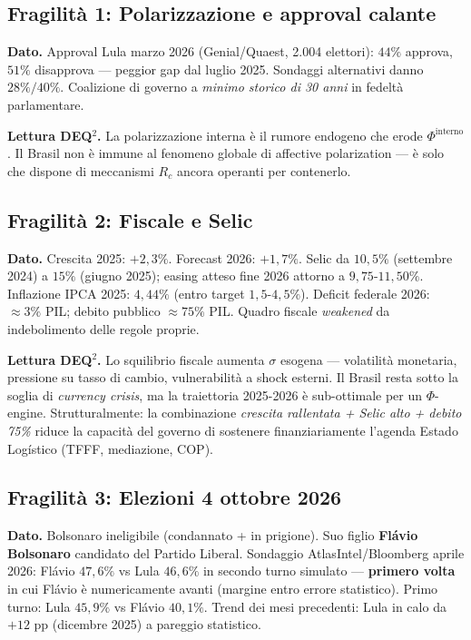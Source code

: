 \subsection{Fragilità 1: Polarizzazione e approval
calante}\label{fragilituxe0-1-polarizzazione-e-approval-calante}

\Proved{} \textbf{Dato.} Approval Lula marzo 2026 (Genial/Quaest, 2.004
elettori): \(44\%\) approva, \(51\%\) disapprova --- peggior gap dal
luglio 2025. Sondaggi alternativi danno \(28\%/40\%\). Coalizione di
governo a \emph{minimo storico di 30 anni} in fedeltà parlamentare.

\Conj{} \textbf{Lettura DEQ$^2$.} La polarizzazione interna è il rumore
endogeno che erode \(\Phi^{\text{interno}}\). Il Brasil non è immune al
fenomeno globale di affective polarization --- è solo che dispone di
meccanismi \(R_c\) ancora operanti per contenerlo.

\subsection{Fragilità 2: Fiscale e
Selic}\label{fragilituxe0-2-fiscale-e-selic}

\Proved{} \textbf{Dato.} Crescita 2025: \(+2{,}3\%\). Forecast 2026:
\(+1{,}7\%\). Selic da \(10{,}5\%\) (settembre 2024) a \(15\%\) (giugno
2025); easing atteso fine 2026 attorno a \(9{,}75\)-\(11{,}50\%\).
Inflazione IPCA 2025: \(4{,}44\%\) (entro target \(1{,}5\)-\(4{,}5\%\)).
Deficit federale 2026: \(\approx 3\%\) PIL; debito pubblico
\(\approx 75\%\) PIL. Quadro fiscale \emph{weakened} da indebolimento
delle regole proprie.

\Conj{} \textbf{Lettura DEQ$^2$.} Lo squilibrio fiscale aumenta \(\sigma\)
esogena --- volatilità monetaria, pressione su tasso di cambio,
vulnerabilità a shock esterni. Il Brasil resta sotto la soglia di
\emph{currency crisis}, ma la traiettoria 2025-2026 è sub-ottimale per
un \(\Phi\)-engine. Strutturalmente: la combinazione \emph{crescita
rallentata + Selic alto + debito 75\%} riduce la capacità del governo di
sostenere finanziariamente l'agenda Estado Logístico (TFFF, mediazione,
COP).

\subsection{Fragilità 3: Elezioni 4 ottobre
2026}\label{fragilituxe0-3-elezioni-4-ottobre-2026}

\Proved{} \textbf{Dato.} Bolsonaro ineligibile (condannato + in
prigione). Suo figlio \textbf{Flávio Bolsonaro} candidato del Partido
Liberal. Sondaggio AtlasIntel/Bloomberg aprile 2026: Flávio \(47{,}6\%\)
vs Lula \(46{,}6\%\) in secondo turno simulato --- \textbf{primero volta}
in cui Flávio è numericamente avanti (margine entro errore statistico).
Primo turno: Lula \(45{,}9\%\) vs Flávio \(40{,}1\%\). Trend dei mesi
precedenti: Lula in calo da \(+12\) pp (dicembre 2025) a pareggio
statistico.


